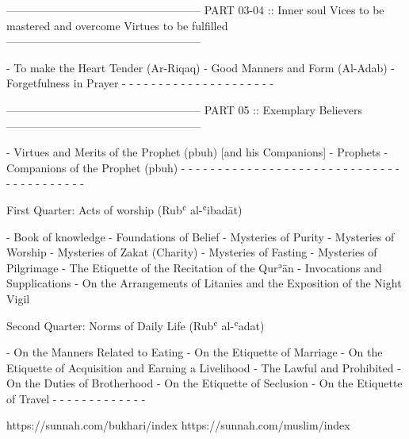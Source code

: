 -----------------------------------------------------
PART 03-04 :: Inner soul
	Vices to be mastered and overcome
	Virtues to be fulfilled
-----------------------------------------------------

	- To make the Heart Tender (Ar-Riqaq)
	- Good Manners and Form (Al-Adab)
	- Forgetfulness in Prayer
	-
	-
	-
	-
	-
	-
	-
	-
	-
	-
	-
	-
	-
	-
	-
	-
	-
	-
	-
	-
	-


-----------------------------------------------------
PART 05 :: Exemplary Believers
-----------------------------------------------------

	- Virtues and Merits of the Prophet (pbuh) [and his Companions]
	- Prophets
	- Companions of the Prophet (pbuh)
	-
	-
	-
	-
	-
	-
	-
	-
	-
	-
	-
	-
	-
	-
	-
	-
	-
	-
	-
	-
	-
	-
	-
	-
	-
	-
	-
	-
	-
	-
	-
	-
	-
	-
	-
	-
	-
	-
	-
	-
	-









First Quarter: Acts of worship (Rubʿ al-ʿibadāt)

	- Book of knowledge
	- Foundations of Belief
	- Mysteries of Purity
	- Mysteries of Worship
	- Mysteries of Zakat (Charity)
	- Mysteries of Fasting
	- Mysteries of Pilgrimage
	- The Etiquette of the Recitation of the Qurʾān
	- Invocations and Supplications
	- On the Arrangements of Litanies and the Exposition of the Night Vigil


Second Quarter: Norms of Daily Life (Rubʿ al-ʿadat)

	- On the Manners Related to Eating
	- On the Etiquette of Marriage
	- On the Etiquette of Acquisition and Earning a Livelihood
	- The Lawful and Prohibited
	- On the Duties of Brotherhood
	- On the Etiquette of Seclusion
	- On the Etiquette of Travel
	-
	-
	-
	-
	-
	-
	-
	-
	-
	-
	-
	-
	-




https://sunnah.com/bukhari/index
https://sunnah.com/muslim/index






